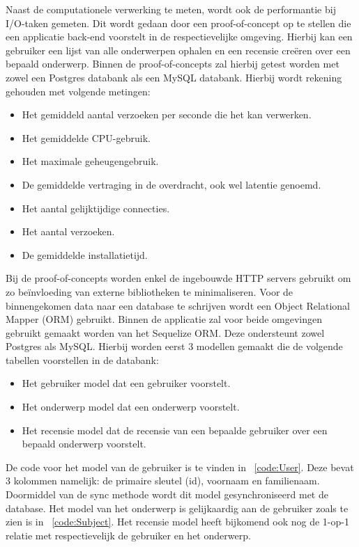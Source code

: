 Naast de computationele verwerking te meten, wordt ook de performantie bij I/O-taken gemeten.
Dit wordt gedaan door een proof-of-concept op te stellen die een applicatie back-end voorstelt in de respectievelijke omgeving.
Hierbij kan een gebruiker een lijst van alle onderwerpen ophalen en een recensie creëren over een bepaald onderwerp. 
Binnen de proof-of-concepts zal hierbij getest worden met zowel een Postgres databank als een MySQL databank.
Hierbij wordt rekening gehouden met volgende metingen:
\begin{itemize}
    \item Het gemiddeld aantal verzoeken per seconde die het kan verwerken.
    \item Het gemiddelde CPU-gebruik.
    \item Het maximale geheugengebruik.
    \item De gemiddelde vertraging in de overdracht, ook wel latentie genoemd.
    \item Het aantal gelijktijdige connecties.
    \item Het aantal verzoeken.
    \item De gemiddelde installatietijd.
\end{itemize}
Bij de proof-of-concepts worden enkel de ingebouwde HTTP servers gebruikt om zo beïnvloeding van externe bibliotheken te minimaliseren.
Voor de binnengekomen data naar een database te schrijven wordt een Object Relational Mapper (ORM) gebruikt.
Binnen de applicatie zal voor beide omgevingen gebruikt gemaakt worden van het Sequelize ORM. Deze ondersteunt zowel Postgres als MySQL.
Hierbij worden eerst 3 modellen gemaakt die de volgende tabellen voorstellen in de databank:
\begin{itemize}
  \item Het gebruiker model dat een gebruiker voorstelt.
  \item Het onderwerp model dat een onderwerp voorstelt.
  \item Het recensie model dat de recensie van een bepaalde gebruiker over een bepaald onderwerp voorstelt.
\end{itemize}
De code voor het model van de gebruiker is te vinden in ~\ref{code:User}. Deze bevat 3 kolommen namelijk: de primaire sleutel (id), voornaam en familienaam.
Doormiddel van de sync methode wordt dit model gesynchroniseerd met de database. 
Het model van het onderwerp is gelijkaardig aan de gebruiker zoals te zien is in ~\ref{code:Subject}. Het recensie model heeft bijkomend 
ook nog de 1-op-1 relatie met respectievelijk de gebruiker en het onderwerp.
